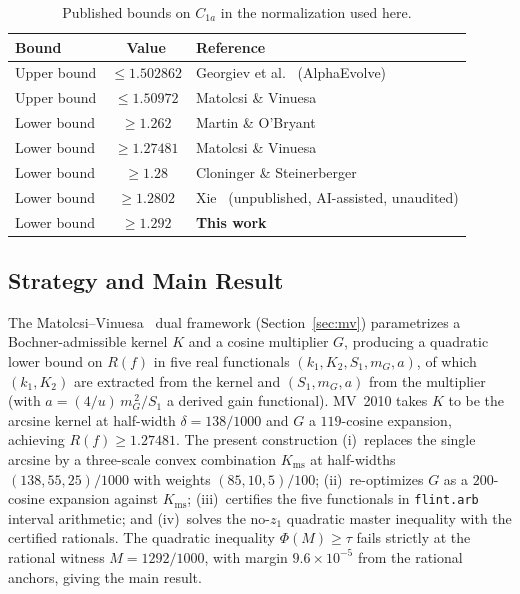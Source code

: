 \documentclass[11pt, letterpaper]{article}
\theoremstyle{paperplain}
\theoremstyle{paperdef}
\newcommand{\Kms}{K_{\mathrm{ms}}}
\begin{document}
\begin{table}[ht]
\centering
\begin{tabular}{lcl}
  \toprule
  \textbf{Bound} & \textbf{Value} & \textbf{Reference} \\
  \midrule
  Upper bound & $\le 1.502862$  & Georgiev et al.~\cite{AlphaEvolve26} (AlphaEvolve) \\
  Upper bound & $\le 1.50972$ & Matolcsi \& Vinuesa~\cite{MV10} \\
  Lower bound & $\ge 1.262$   & Martin \& O'Bryant~\cite{MO2009} \\
  Lower bound & $\ge 1.27481$ & Matolcsi \& Vinuesa~\cite{MV10} \\
  Lower bound & $\ge 1.28$    & Cloninger \& Steinerberger~\cite{CS17} \\
  Lower bound & $\ge 1.2802$  & Xie~\cite{Xie26} (unpublished, AI-assisted, unaudited) \\
  Lower bound & $\ge 1.292$   & \textbf{This work} \\
  \bottomrule
\end{tabular}
\caption[Published bounds on C1a in the normalization used here.]{Published bounds on $C_{1a}$ in the normalization used here.}
\label{tab:published-bounds}
\end{table}

\subsection{Strategy and Main Result}\label{subsec:intro-strategy}

The Matolcsi--Vinuesa~\cite{MV10} dual framework
(Section~\ref{sec:mv}) parametrizes a Bochner-admissible kernel $K$ and
a cosine multiplier $G$, producing a quadratic lower bound on $R(f)$
in five real functionals $(k_1,K_2,S_1,m_G,a)$, of which $(k_1,K_2)$
are extracted from the kernel and $(S_1,m_G,a)$ from the multiplier
(with $a=(4/u)\,m_G^{\,2}/S_1$ a derived gain functional).  MV~2010 takes $K$ to
be the arcsine kernel at half-width $\delta=138/1000$ and $G$ a
$119$-cosine expansion, achieving $R(f)\ge 1.27481$.  The present
construction (i)~replaces the single arcsine by a three-scale convex
combination $\Kms$ at half-widths $(138,55,25)/1000$ with weights
$(85,10,5)/100$; (ii)~re-optimizes $G$ as a $200$-cosine expansion
against $\Kms$; (iii)~certifies the five functionals in
\texttt{flint.arb} interval arithmetic; and (iv)~solves the no-$z_1$
quadratic master inequality with the certified rationals.  The
quadratic inequality $\Phi(M)\ge\tau$ fails strictly at the rational
witness $M=1292/1000$, with margin $9.6\times 10^{-5}$ from the
rational anchors, giving the main result.
\end{document}
